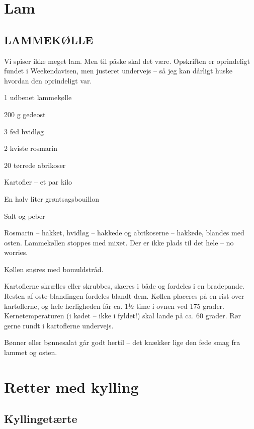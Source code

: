 \documentclass[
]{book}
\begin{document}
\hypertarget{lam}{%
\chapter{Lam}\label{lam}}

\hypertarget{lammekuxf8lle}{%
\section{LAMMEKØLLE}\label{lammekuxf8lle}}

Vi spiser ikke meget lam. Men til påske skal det være. Opskriften er oprindeligt fundet i Weekendavisen, men justeret undervejs -- så jeg kan dårligt huske hvordan den oprindeligt var.

1 udbenet lammekølle

200 g gedeost

3 fed hvidløg

2 kviste rosmarin

20 tørrede abrikoser

Kartofler -- et par kilo

En halv liter grøntsagsbouillon

Salt og peber

Rosmarin -- hakket, hvidløg -- hakkede og abrikoserne -- hakkede, blandes med osten. Lammekøllen stoppes med mixet. Der er ikke plads til det hele -- no worries.

Køllen snøres med bomuldstråd.

Kartoflerne skrælles eller skrubbes, skæres i både og fordeles i en bradepande. Resten af oste-blandingen fordeles blandt dem. Køllen placeres på en rist over kartoflerne, og hele herligheden får ca. 1½ time i ovnen ved 175 grader. Kernetemperaturen (i kødet -- ikke i fyldet!) skal lande på ca. 60 grader. Rør gerne rundt i kartoflerne undervejs.

Bønner eller bønnesalat går godt hertil -- det knækker lige den fede smag fra lammet og osten.

\hypertarget{retter-med-kylling}{%
\chapter{Retter med kylling}\label{retter-med-kylling}}

\hypertarget{kyllingetuxe6rte}{%
\section{Kyllingetærte}\label{kyllingetuxe6rte}}
\end{document}
